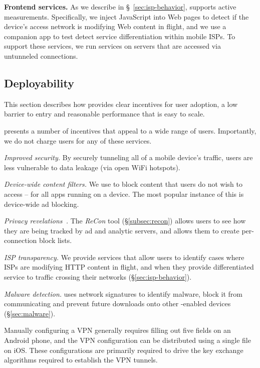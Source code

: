 \noindent\textbf{Frontend services.} As we describe in \S~\ref{sec:isp-behavior}, 
\meddle supports active measurements. 
Specifically, we inject JavaScript into Web pages to detect if the device's 
access network is modifying Web content in flight, and we use a companion app to 
test detect service differentiation within mobile ISPs. To support these services, we 
run services on \meddle servers that are accessed via untunneled connections. 

\subsection{Deployability}
\label{subsec:design_deploy}

This section describes how \meddle provides clear incentives for user adoption, a 
low barrier to entry and reasonable performance that is easy to scale.

 \meddle presents a number of incentives 
that appeal to a wide range of users. Importantly, we do not charge users for any of these 
services.

\noindent \emph{Improved security.} By securely tunneling all of a mobile device's traffic, users 
are less vulnerable to data leakage (\eg via open WiFi hotspots). 

\noindent \emph{Device-wide content filters.} We use \meddle to block content that users do 
not wish to access -- for all apps running on a device. The most popular instance of this is 
device-wide ad blocking.

\noindent \emph{Privacy revelations~\cite{wetherall:revelations}.} The \emph{ReCon} tool (\S\ref{subsec:recon}) allows users to see how they are being 
tracked by ad and analytic servers, and allows them to create per-connection block lists.  

\noindent \emph{ISP transparency.} We provide services that allow users to identify cases where 
ISPs are modifying HTTP content in flight, and when they provide differentiated service to 
traffic crossing their networks (\S\ref{sec:isp-behavior}).

\noindent \emph{Malware detection.} \meddle uses network signatures to identify malware, block it from 
communicating and prevent future downloads onto other \meddle-enabled devices (\S\ref{sec:malware}).  

Manually configuring a VPN generally requires filling out five fields on an Android phone, and the VPN configuration can be distributed using a single file on iOS. 
These configurations are primarily required to drive the key exchange algorithms required to establish the VPN tunnels.

